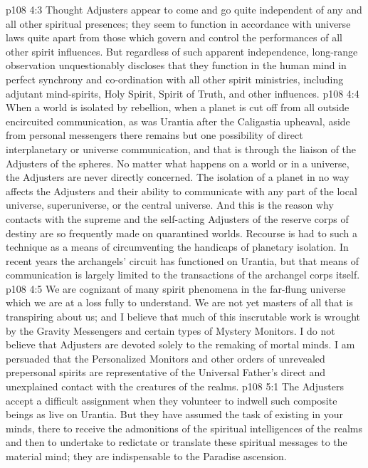\vs p108 4:3 Thought Adjusters appear to come and go quite independent of any and all other spiritual presences; they seem to function in accordance with universe laws quite apart from those which govern and control the performances of all other spirit influences. But regardless of such apparent independence, long\hyp{}range observation unquestionably discloses that they function in the human mind in perfect synchrony and co\hyp{}ordination with all other spirit ministries, including adjutant mind\hyp{}spirits, Holy Spirit, Spirit of Truth, and other influences.
\vs p108 4:4 When a world is isolated by rebellion, when a planet is cut off from all outside encircuited communication, as was Urantia after the Caligastia upheaval, aside from personal messengers there remains but one possibility of direct interplanetary or universe communication, and that is through the liaison of the Adjusters of the spheres. No matter what happens on a world or in a universe, the Adjusters are never directly concerned. The isolation of a planet in no way affects the Adjusters and their ability to communicate with any part of the local universe, superuniverse, or the central universe. And this is the reason why contacts with the supreme and the self\hyp{}acting Adjusters of the reserve corps of destiny are so frequently made on quarantined worlds. Recourse is had to such a technique as a means of circumventing the handicaps of planetary isolation. In recent years the archangels’ circuit has functioned on Urantia, but that means of communication is largely limited to the transactions of the archangel corps itself.\plusone
\pc \vs p108 4:5 We are cognizant of many spirit phenomena in the far\hyp{}flung universe which we are at a loss fully to understand. We are not yet masters of all that is transpiring about us; and I believe that much of this inscrutable work is wrought by the Gravity Messengers and certain types of Mystery Monitors. I do not believe that Adjusters are devoted solely to the remaking of mortal minds. I am persuaded that the Personalized Monitors and other orders of unrevealed prepersonal spirits are representative of the Universal Father’s direct and unexplained contact with the creatures of the realms.
\vs p108 5:1 The Adjusters accept a difficult assignment when they volunteer to indwell such composite beings as live on Urantia. But they have assumed the task of existing in your minds, there to receive the admonitions of the spiritual intelligences of the realms and then to undertake to redictate or translate these spiritual messages to the material mind; they are indispensable to the Paradise ascension.
